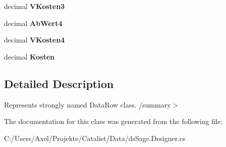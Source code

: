 \begin{DoxyCompactItemize}
\item 
decimal {\bfseries V\+Kosten3}\hypertarget{class_products_1_1_data_1_1ds_sage_1_1_versandkostenstaffel_row_a26592e3ed0d5085743ed01113a555583}{}\label{class_products_1_1_data_1_1ds_sage_1_1_versandkostenstaffel_row_a26592e3ed0d5085743ed01113a555583}

\item 
decimal {\bfseries Ab\+Wert4}\hypertarget{class_products_1_1_data_1_1ds_sage_1_1_versandkostenstaffel_row_a396501b7d7209a55320696a8a88597cd}{}\label{class_products_1_1_data_1_1ds_sage_1_1_versandkostenstaffel_row_a396501b7d7209a55320696a8a88597cd}

\item 
decimal {\bfseries V\+Kosten4}\hypertarget{class_products_1_1_data_1_1ds_sage_1_1_versandkostenstaffel_row_a484268d430d1a7fdd35af30ca9e0f9c0}{}\label{class_products_1_1_data_1_1ds_sage_1_1_versandkostenstaffel_row_a484268d430d1a7fdd35af30ca9e0f9c0}

\item 
decimal {\bfseries Kosten}\hypertarget{class_products_1_1_data_1_1ds_sage_1_1_versandkostenstaffel_row_a2392fc100805e7c3eea5862a059e25e9}{}\label{class_products_1_1_data_1_1ds_sage_1_1_versandkostenstaffel_row_a2392fc100805e7c3eea5862a059e25e9}

\end{DoxyCompactItemize}


\subsection{Detailed Description}
Represents strongly named Data\+Row class. /summary$>$ 

The documentation for this class was generated from the following file\+:\begin{DoxyCompactItemize}
\item 
C\+:/\+Users/\+Axel/\+Projekte/\+Catalist/\+Data/ds\+Sage.\+Designer.\+cs\end{DoxyCompactItemize}
